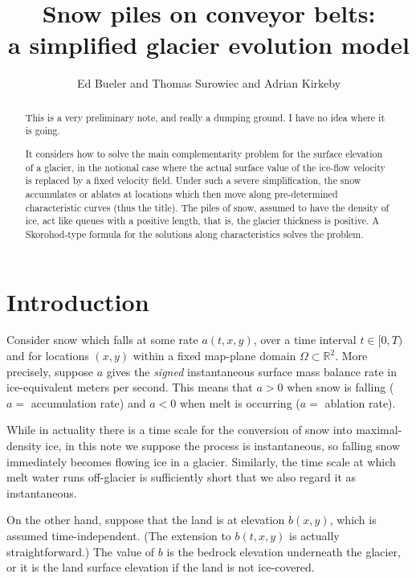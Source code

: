 \documentclass[hidelinks,onefignum,onetabnum,final]{siamart220329}  %
\title{Snow piles on conveyor belts: \\ a simplified glacier evolution model}
\author{Ed Bueler and Thomas Surowiec and Adrian Kirkeby}
\newcommand{\RR}{\mathbb{R}}
\begin{document}
\maketitle

\begin{abstract}
This is a very preliminary note, and really a dumping ground.  I have no idea where it is going.

It considers how to solve the main complementarity problem for the surface elevation of a glacier, in the notional case where the actual surface value of the ice-flow velocity is replaced by a fixed velocity field.  Under such a severe simplification, the snow accumulates or ablates at locations which then move along pre-determined characteristic curves (thus the title).  The piles of snow, assumed to have the density of ice, act like queues with a positive length, that is, the glacier thickness is positive.  A Skorohod-type formula for the solutions along characteristics solves the problem.
\end{abstract}


\section{Introduction}

Consider snow which falls at some rate $a(t,x,y)$, over a time interval $t\in [0,T)$ and for locations $(x,y)$ within a fixed map-plane domain $\Omega \subset \RR^2$.  More precisely, suppose $a$ gives the \emph{signed} instantaneous surface mass balance rate \cite{Cogleyetal2011} in ice-equivalent meters per second.  This means that $a>0$ when snow is falling ($a=$ accumulation rate) and $a<0$ when melt is occurring ($a=$ ablation rate).

While in actuality there is a time scale for the conversion of snow into maximal-density ice, in this note we suppose the process is instantaneous, so falling snow immediately becomes flowing ice in a glacier.  Similarly, the time scale at which melt water runs off-glacier is sufficiently short that we also regard it as instantaneous.

On the other hand, suppose that the land is at elevation $b(x,y)$, which is assumed time-independent.  (The extension to $b(t,x,y)$ is actually straightforward.)  The value of $b$ is the bedrock elevation underneath the glacier, or it is the land surface elevation if the land is not ice-covered.
\end{document}

